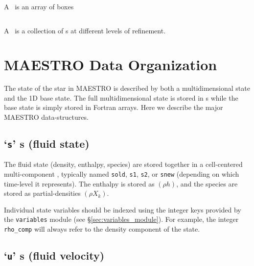 \subsection{\boxarray}

A \boxarray\ is an array of boxes

\subsection{\mlboxarray}

A \mlboxarray\ is a collection of \boxarray s at different levels of
refinement.

\subsection{\mllayout}


\subsection{\bctower}


\section{MAESTRO Data Organization}

The state of the star in MAESTRO is described by both a
multidimensional state and the 1D base state.  The full
multidimensional state is stored in \multifab s while the base state
is simply stored in Fortran arrays.  Here we describe the
major MAESTRO data-structures.

\subsection{`{\tt s}' \multifab s (fluid state)}

The fluid state (density, enthalpy, species) are stored together in a
cell-centered multi-component \multifab, typically named {\tt sold},
{\tt s1}, {\tt s2}, or {\tt snew} (depending on which time-level it
represents).  The enthalpy is stored as $(\rho h)$, and the species
are stored as partial-densities $(\rho X_k)$.

Individual state variables should be indexed using the integer keys provided 
by the {\tt variables} module (see \S \ref{sec:variables_module}).  For example,
the integer {\tt rho\_comp} will always refer to the density component of the state.


\subsection{`{\tt u}' \multifab s (fluid velocity)}

